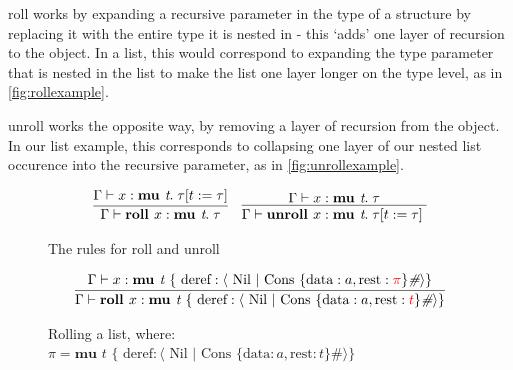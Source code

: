 \textsf{roll} works by expanding a recursive parameter 
in the type of a structure by replacing it with the entire type it is nested in - this `adds' one 
layer of recursion to the object. In a list, this would correspond to expanding the type parameter
that is nested in the list to make the list one layer longer on the type level, as in \autoref{fig:rollexample}.

\textsf{unroll} works the opposite way, by removing a layer of recursion from the object. In our
list example, this corresponds to collapsing one layer of our nested list occurence into the
recursive parameter, as in \autoref{fig:unrollexample}. 

\begin{figure}
    \centering
    \begin{align*}
        \infer{
            \Gamma \vdash \textbf{roll } x : \textbf{mu } \textit{t}.\; \tau
        }{
            \Gamma \vdash x : \textbf{mu } \textit{t}.\; \tau[ t := \tau]
        }
        && \infer{
            \Gamma \vdash \textbf{unroll } x : \textbf{mu } \textit{t}.\; \tau[ t := \tau]\; 
        }{
            \Gamma \vdash x : \textbf{mu } \textit{t}.\; \tau
        }
    \end{align*}
    \caption{The rules for roll and unroll}
    \label{def:rollunroll}
\end{figure}

\begin{figure}
    \centering
    \begin{align*}
        \infer{
            \Gamma \vdash \textbf{roll } x : \textbf{mu } \textit{t } \{ \text{ deref}: \langle \text{ Nil } \vert \text{ Cons } \{ \text{data}: a, \text{rest}: {\color{red} t} \}\textit{\#} \rangle \} 
        }{
            \Gamma \vdash x : \textbf{mu } \textit{t } \{ \text{ deref}: \langle \text{ Nil } \vert \text{ Cons } \{ \text{data}: a, \text{rest}: {\color{red} \pi} \}\textit{\#} \rangle \} 
        }
    \end{align*}
    \caption{Rolling a list, where: \newline \protect\phantom{Figure x.x:} $\pi = \textbf{mu } \textit{t } \{ \text{ deref}: \langle \text{ Nil } \vert \text{ Cons } \{ \text{data}: a, \text{rest}: t \}\textit{\#} \rangle \}$}
    \label{fig:rollexample}
\end{figure}

